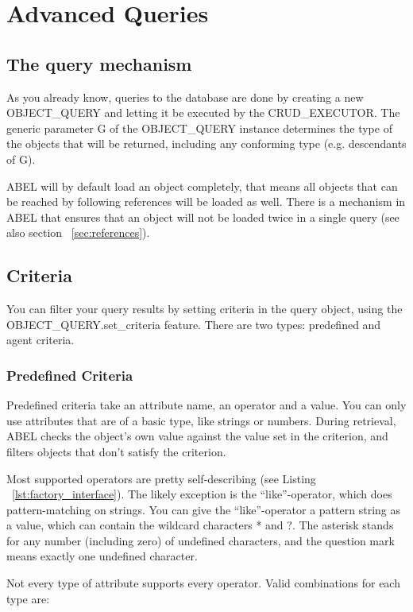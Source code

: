 \section{Advanced Queries}
\label{sec:query}

\subsection{The query mechanism}

As you already know, queries to the database are done by creating a new OBJECT\_QUERY and letting it be executed by the CRUD\_EXECUTOR.
The generic parameter G of the OBJECT\_QUERY instance determines the type of the objects that will be returned, including any conforming type (e.g. descendants of G).

ABEL will by default load an object completely, that means all objects that can be reached by following references will be loaded as well. 
There is a mechanism in ABEL that ensures that an object will not be loaded twice in a single query (see also section ~\ref{sec:references}).


\subsection{Criteria}

You can filter your query results by setting criteria in the query object, using the OBJECT\_QUERY.set\_criteria feature.
There are two types: predefined and agent criteria.

\subsubsection{Predefined Criteria}
Predefined criteria take an attribute name, an operator and a value. 
You can only use attributes that are of a basic type, like strings or numbers.
During retrieval, ABEL checks the object's own value against the value set in the criterion, and filters objects that don't satisfy the criterion.

Most supported operators are pretty self-describing (see Listing ~\ref{lst:factory_interface}).
The likely exception is the ``like''-operator, which does pattern-matching on strings.
You can give the ``like''-operator a pattern string as a value, which can contain the wildcard characters * and ?.
The asterisk stands for any number (including zero) of undefined characters, and the question mark means exactly one undefined character.

Not every type of attribute supports every operator. Valid combinations for each type are:

